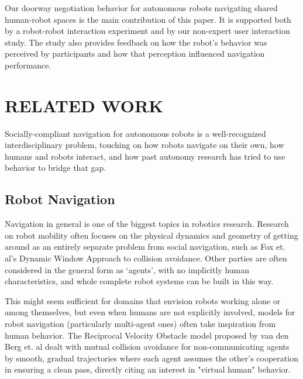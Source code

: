 \documentclass[letterpaper, 10 pt, conference]{ieeeconf}  %
\begin{document}

Our doorway negotiation behavior for autonomous robots navigating shared human-robot spaces is the main contribution of this paper. It is supported both by a robot-robot interaction experiment and by our non-expert user interaction study. The study also provides feedback on how the robot’s behavior was perceived by participants and how that perception influenced navigation performance.

\section{RELATED WORK}

Socially-compliant navigation for autonomous robots is a well-recognized interdisciplinary problem, touching on how robots navigate on their own, how humans and robots interact, and how past autonomy research has tried to use behavior to bridge that gap.

\subsection{Robot Navigation}

Navigation in general is one of the biggest topics in robotics research. Research on robot mobility often focuses on the physical dynamics and geometry of getting around as an entirely separate problem from social navigation, such as Fox et. al's Dynamic Window Approach to collision avoidance\cite{c2}. Other parties are often considered in the general form as ‘agents’, with no implicitly human characteristics, and whole complete robot systems can be built in this way. 

This might seem sufficient for domains that envision robots working alone or among themselves, but even when humans are not explicitly involved, models for robot navigation (particularly multi-agent ones) often take inspiration from human behavior. The Reciprocal Velocity Obstacle model proposed by van den Berg et. al\cite{c3} dealt with mutual collision avoidance for non-communicating agents by smooth, gradual trajectories where each agent assumes the other’s cooperation in ensuring a clean pass, directly citing an interest in "virtual human" behavior. 
\end{document}
